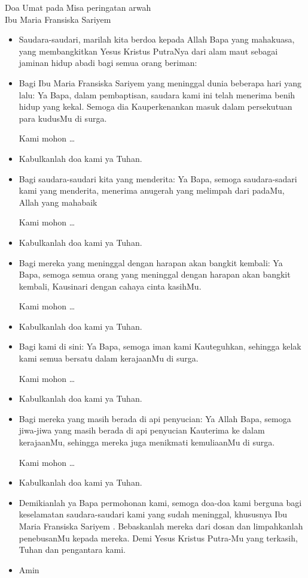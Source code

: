 \documentclass[12pt,a4paper]{article}
\newcommand{\BU}[1]{\begin{itemize} \item[U:] #1 \end{itemize}}
\newcommand{\BI}[1]{\begin{itemize} \item[I:] #1 \end{itemize}}
\newcommand{\BP}[1]{\begin{itemize} \item[P:] #1 \end{itemize}}
\newcommand{\arwah}{Ibu Maria Fransiska Sariyem }
\begin{document}
\thispagestyle{empty}
\begin{center}\Large{Doa Umat pada Misa peringatan arwah\\ \arwah }\end{center}

\vspace{0.5cm}
\BI{Saudara-saudari, marilah kita berdoa kepada Allah Bapa yang mahakuasa, yang membangkitkan Yesus Kristus PutraNya dari alam maut sebagai jaminan hidup abadi bagi semua orang beriman:}

\BP{Bagi \arwah yang meninggal dunia beberapa hari yang lalu: Ya Bapa, dalam pembaptisan, saudara kami ini telah menerima benih hidup yang kekal. Semoga dia Kauperkenankan masuk dalam persekutuan para kudusMu di surga. 

Kami mohon \dots}

\BU{Kabulkanlah doa kami ya Tuhan.}

\BP{Bagi saudara-saudari kita yang menderita: Ya Bapa, semoga saudara-sadari kami yang menderita, menerima anugerah yang melimpah dari padaMu, Allah yang mahabaik 

Kami mohon \dots}
\BU{Kabulkanlah doa kami ya Tuhan.}

\BP{Bagi mereka yang meninggal dengan harapan akan bangkit kembali: Ya Bapa, semoga semua orang yang meninggal dengan harapan akan bangkit kembali, Kausinari dengan cahaya cinta kasihMu. 

Kami mohon \dots}

\BU{Kabulkanlah doa kami ya Tuhan.}

\BP{Bagi kami di sini: Ya Bapa, semoga iman kami Kauteguhkan, sehingga kelak kami semua bersatu dalam kerajaanMu di surga.

 Kami mohon \dots}

\BU{Kabulkanlah doa kami ya Tuhan.}

\BP{Bagi mereka yang masih berada di api penyucian: Ya Allah Bapa, semoga jiwa-jiwa yang masih berada di api penyucian Kauterima ke dalam kerajaanMu, sehingga mereka juga menikmati kemuliaanMu di surga. 

Kami mohon \dots}

\BU{Kabulkanlah doa kami ya Tuhan.}

\BI{Demikianlah ya Bapa permohonan kami, semoga doa-doa kami berguna bagi keselamatan saudara-saudari kami yang sudah meninggal, khususnya \arwah{.} Bebaskanlah mereka dari dosan dan limpahkanlah penebusanMu kepada mereka.    
Demi Yesus Kristus Putra-Mu yang terkasih, Tuhan dan pengantara kami.}

\BU{Amin}
\end{document}
